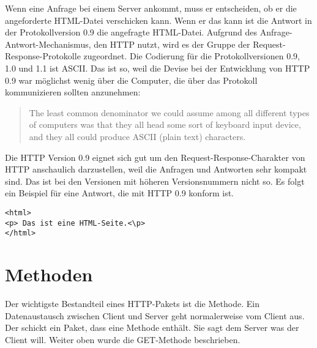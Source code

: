 \documentclass{llncs}
\begin{document}
Wenn eine Anfrage bei einem Server ankommt, muss er entscheiden, ob er die angeforderte HTML-Datei verschicken kann. Wenn er das kann ist die Antwort in der Protokollversion 0.9 die angefragte HTML-Datei. Aufgrund des Anfrage-Antwort-Mechanismus, den HTTP nutzt, wird es der Gruppe der Request-Response-Protokolle zugeordnet. Die Codierung für die Protokollversionen 0.9, 1.0 und 1.1 ist ASCII. Das ist so, weil die Devise bei der Entwicklung von HTTP 0.9 war möglichst wenig über die Computer, die über das Protokoll kommunizieren sollten anzunehmen: \begin{quote} The least common denominator we could assume among all different types of computers was that they all head some sort of keyboard input device, and they all could produce ASCII (plain text) characters. \cite{Berners-Lee1999} \end{quote} Die HTTP Version 0.9 eignet sich gut um den Request-Response-Charakter von HTTP anschaulich darzustellen, weil die Anfragen und Antworten sehr kompakt sind. Das ist bei den Versionen mit höheren Versionsnummern nicht so. Es folgt ein Beispiel für eine Antwort, die mit HTTP 0.9 konform ist.
\begin{verbatim}
<html>
<p> Das ist eine HTML-Seite.<\p>
</html>
\end{verbatim}
\section{Methoden}
Der wichtigste Bestandteil eines HTTP-Pakets ist die Methode. Ein Datenaustausch zwischen Client und Server geht normalerweise vom Client aus. Der schickt ein Paket, dass eine Methode enthält. Sie sagt dem Server was der Client will. Weiter oben wurde die GET-Methode beschrieben. 
\end{document}
